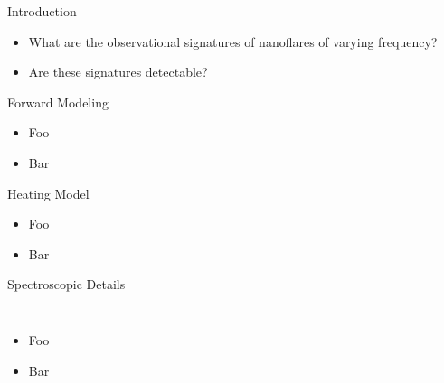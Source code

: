 \documentclass[final]{beamer}
\begin{document}
\begin{frame}
\begin{columns}[T]
\begin{column}{0.49\linewidth}
\begin{block}{Introduction}
\begin{itemize}
      \begin{itemize}
        \item What are the observational signatures of nanoflares of varying frequency?
        \item Are these signatures detectable?
      \end{itemize}
    \end{itemize}
    \end{block}
    \begin{block}{Forward Modeling}
      \vspace{-1ex}
      \begin{itemize}
      \item Foo
      \item Bar
      \end{itemize}
    \end{block}
    \begin{block}{Heating Model}
      \vspace{-1ex}
      \begin{itemize}
      \item Foo
      \item Bar
      \end{itemize}
    \end{block}
    \begin{block}{Spectroscopic Details}
      \begin{columns}[T]
      \begin{column}{0.49\columnwidth}
        \vspace{-2ex}
        \begin{figure}
        \end{figure}
      \end{column}
      \begin{column}{0.49\columnwidth}
        \vspace{-6ex}
        \begin{figure}
        \end{figure}
        \vspace{-2ex}
      \end{column}
      \end{columns}
      \begin{itemize}
      \item Foo
      \item Bar
      \end{itemize}

\end{block}
\end{column}
\end{columns}
\end{frame}
\end{document}
